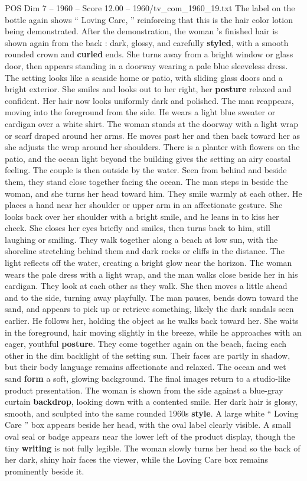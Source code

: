 \begin{textsample}{POS Dim 7 – 1960 – Score 12.00 – 1960/tv\_com\_1960\_19.txt}
The label on the bottle again shows “ Loving Care, ” reinforcing that this is the hair color lotion being demonstrated.
After the demonstration, the woman ’s finished hair is shown again from the back : dark, glossy, and carefully \textbf{styled}, with a smooth rounded crown and \textbf{curled} ends.
She turns away from a bright window or glass door, then appears standing in a doorway wearing a pale blue sleeveless dress.
The setting looks like a seaside home or patio, with sliding glass doors and a bright exterior.
She smiles and looks out to her right, her \textbf{posture} relaxed and confident.
Her hair now looks uniformly dark and polished.
The man reappears, moving into the foreground from the side.
He wears a light blue sweater or cardigan over a white shirt.
The woman stands at the doorway with a light wrap or scarf draped around her arms.
He moves past her and then back toward her as she adjusts the wrap around her shoulders.
There is a planter with flowers on the patio, and the ocean light beyond the building gives the setting an airy coastal feeling.
The couple is then outside by the water.
Seen from behind and beside them, they stand close together facing the ocean.
The man steps in beside the woman, and she turns her head toward him.
They smile warmly at each other.
He places a hand near her shoulder or upper arm in an affectionate gesture.
She looks back over her shoulder with a bright smile, and he leans in to kiss her cheek.
She closes her eyes briefly and smiles, then turns back to him, still laughing or smiling.
They walk together along a beach at low sun, with the shoreline stretching behind them and dark rocks or cliffs in the distance.
The light reflects off the water, creating a bright glow near the horizon.
The woman wears the pale dress with a light wrap, and the man walks close beside her in his cardigan.
They look at each other as they walk.
She then moves a little ahead and to the side, turning away playfully.
The man pauses, bends down toward the sand, and appears to pick up or retrieve something, likely the dark sandals seen earlier.
He follows her, holding the object as he walks back toward her.
She waits in the foreground, hair moving slightly in the breeze, while he approaches with an eager, youthful \textbf{posture}.
They come together again on the beach, facing each other in the dim backlight of the setting sun.
Their faces are partly in shadow, but their body language remains affectionate and relaxed.
The ocean and wet sand \textbf{form} a soft, glowing background.
The final images return to a studio-like product presentation.
The woman is shown from the side against a blue-gray curtain \textbf{backdrop}, looking down with a contented smile.
Her dark hair is glossy, smooth, and sculpted into the same rounded 1960s \textbf{style}.
A large white “ Loving Care ” box appears beside her head, with the oval label clearly visible.
A small oval seal or badge appears near the lower left of the product display, though the tiny \textbf{writing} is not fully legible.
The woman slowly turns her head so the back of her dark, shiny hair faces the viewer, while the Loving Care box remains prominently beside it.


\end{textsample}
